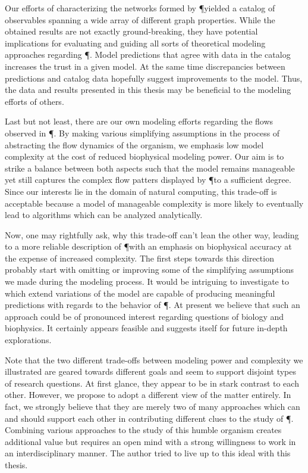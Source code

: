 	Our efforts of characterizing the networks formed by \P yielded a catalog of observables spanning a wide array of different graph properties. While the obtained results are not exactly ground-breaking, they have potential implications for evaluating and guiding all sorts of theoretical modeling approaches regarding \P. Model predictions that agree with data in the catalog increases the trust in a given model. At the same time discrepancies between predictions and catalog data hopefully suggest improvements to the model. Thus, the data and results presented in this thesis may be beneficial to the modeling efforts of others.

	Last but not least, there are our own modeling efforts regarding the flows observed in \P. By making various simplifying assumptions in the process of abstracting the flow dynamics of the organism, we emphasis low model complexity at the cost of reduced biophysical modeling power. Our aim is to strike a balance between both aspects such that the model remains manageable yet still captures the complex flow patters displayed by \P to a sufficient degree. Since our interests lie in the domain of natural computing, this trade-off is acceptable because a model of manageable complexity is more likely to eventually lead to algorithms which can be analyzed analytically. 

	Now, one may rightfully ask, why this trade-off can't lean the other way, leading to a more reliable description of \P with an emphasis on biophysical accuracy at the expense of increased complexity. The first steps towards this direction probably start with omitting or improving some of the simplifying assumptions we made during the modeling process. It would be intriguing to investigate to which extend variations of the model are capable of producing meaningful predictions with regards to the behavior of \P. At present we believe that such an approach could be of pronounced interest regarding questions of biology and biophysics. It certainly appears feasible and suggests itself for future in-depth explorations.

	Note that the two different trade-offs between modeling power and complexity we illustrated are geared towards different goals and seem to support disjoint types of research questions. At first glance, they appear to be in stark contrast to each other. However, we propose to adopt a different view of the matter entirely. In fact, we strongly believe that they are merely two of many approaches which can and should support each other in contributing different clues to the study of \P. Combining various approaches to the study of this humble organism creates additional value but requires an open mind with a strong willingness to work in an interdisciplinary manner. The author tried to live up to this ideal with this thesis.

